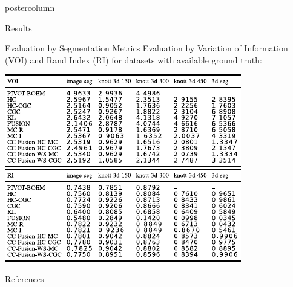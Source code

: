 \documentclass[final,hyperref={pdfpagelabels=false}]{beamer}
\begin{document}
\begin{frame}
\begin{columns}
\begin{column}{.49\textwidth}
\begin{beamercolorbox}[center,wd=\textwidth]{postercolumn}
\begin{minipage}[T]{.95\textwidth}
{\begin{block}{Results}
            \end{block}
            \vfill
            \begin{block}{Evaluation by Segmentation Metrics}
                Evaluation by Variation of Information (VOI) and
                Rand Index (RI) for datasets with available ground truth:
                \vspace{1cm}


              \centering
              \includegraphics[width=0.7\linewidth]{virib.pdf}            
            \end{block}
            \vfill
            \vfill
            \begin{block}{References}
                \footnotesize
                
                

\end{block}}
\end{minipage}
\end{beamercolorbox}
\end{column}
\end{columns}
\end{frame}
\end{document}
